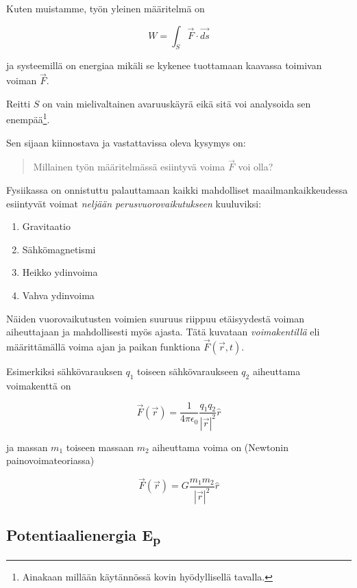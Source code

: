 \documentclass[12pt,a4paper,finnish]{book}
\begin{document}
Kuten muistamme, työn yleinen määritelmä on

\begin{equation}
 W = \int_S \vec{F} \cdot \vec{ds}
\end{equation}

ja systeemillä on energiaa mikäli se kykenee tuottamaan kaavassa toimivan voiman $\vec{F}$.

Reitti $S$ on vain mielivaltainen avaruuskäyrä eikä sitä voi analysoida sen enempää\footnote{
Ainakaan millään käytännössä kovin hyödyllisellä tavalla.}.

Sen sijaan kiinnostava ja vastattavissa oleva kysymys on:

\begin{quote}
 Millainen työn määritelmässä esiintyvä voima $\vec{F}$ voi olla? 
\end{quote}

Fysiikassa on onnistuttu palauttamaan kaikki mahdolliset maailmankaikkeudessa esiintyvät voimat 
\textit{neljään perusvuorovaikutukseen} kuuluviksi:

\begin{enumerate}
 \item Gravitaatio
 \item Sähkömagnetismi
 \item Heikko ydinvoima
 \item Vahva ydinvoima
\end{enumerate}

Näiden vuorovaikutusten voimien suuruus riippuu etäisyydestä voiman aiheuttajaan ja mahdollisesti myös ajasta. 
Tätä kuvataan \textit{voimakentillä} eli määrittämällä voima ajan ja paikan funktiona $\vec{F}(\vec{r}, t)$. 

Esimerkiksi sähkövarauksen $q_1$ toiseen sähkövaraukseen $q_2$ aiheuttama voimakenttä on

\begin{equation}
 \vec{F}(\vec{r}) = \frac{1}{4\pi\epsilon_0}\frac{q_1q_2}{|\vec{r}|^2}\hat{r}
\end{equation}

ja massan $m_1$ toiseen massaan $m_2$ aiheuttama voima on (Newtonin painovoimateoriassa)

\begin{equation}
 \vec{F}(\vec{r}) = G\frac{m_1m_2}{|\vec{r}|^2}\hat{r}
\end{equation}

\subsection{Potentiaalienergia E\textsubscript{p}}
\end{document}
